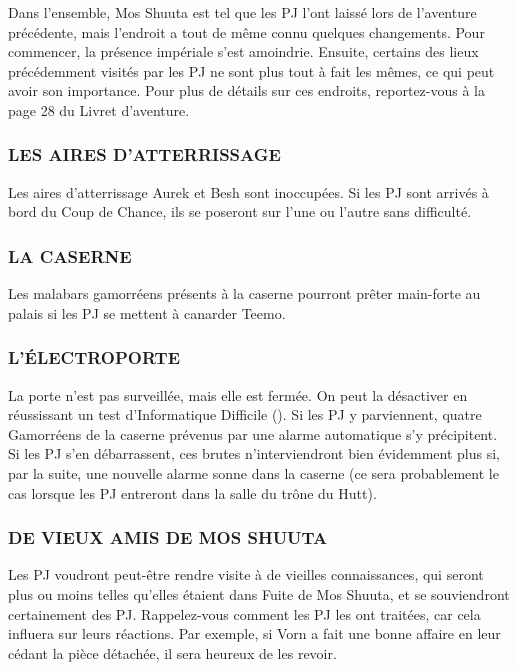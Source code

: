 \documentclass[a4paper,10pt,twoside,twocolumn,openany]{book}
\begin{document}
\subtitle{MOS SHUUTA}

Dans l’ensemble, Mos Shuuta est tel que les PJ l’ont laissé lors de l’aventure précédente, mais l’endroit a tout de
même connu quelques changements. Pour commencer,
la présence impériale s’est amoindrie. Ensuite, certains
des lieux précédemment visités par les PJ ne sont plus
tout à fait les mêmes, ce qui peut avoir son importance.
Pour plus de détails sur ces endroits, reportez-vous à la
page 28 du Livret d’aventure.

\subsubsection{LES AIRES D’ATTERRISSAGE}

Les aires d’atterrissage Aurek et Besh sont inoccupées.
Si les PJ sont arrivés à bord du Coup de Chance, ils se
poseront sur l’une ou l’autre sans difficulté.

\subsubsection{LA CASERNE}
Les malabars gamorréens présents à la caserne pourront
prêter main-forte au palais si les PJ se mettent à canarder Teemo.

\subsubsection{L’ÉLECTROPORTE}
La porte n’est pas surveillée, mais elle est fermée. On
peut la désactiver en réussissant un test d’Informatique Difficile (\difficulty \difficulty \difficulty). Si les PJ y parviennent, quatre
Gamorréens de la caserne prévenus par une alarme automatique s’y précipitent. Si les PJ s’en débarrassent,
ces brutes n’interviendront bien évidemment plus si, par
la suite, une nouvelle alarme sonne dans la caserne (ce
sera probablement le cas lorsque les PJ entreront dans
la salle du trône du Hutt).

\subsubsection{DE VIEUX AMIS DE MOS SHUUTA}
Les PJ voudront peut-être rendre visite à de vieilles
connaissances, qui seront plus ou moins telles qu’elles
étaient dans Fuite de Mos Shuuta, et se souviendront
certainement des PJ. Rappelez-vous comment les PJ
les ont traitées, car cela influera sur leurs réactions. Par
exemple, si Vorn a fait une bonne affaire en leur cédant la
pièce détachée, il sera heureux de les revoir.
\end{document}
